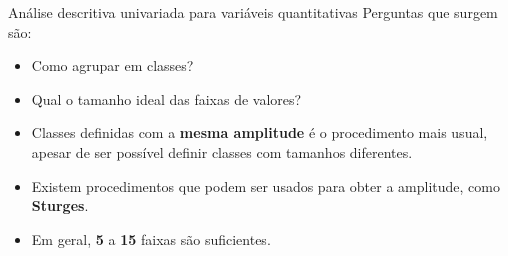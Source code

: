 \documentclass[
  ignorenonframetext,
  serif,
  professionalfont,
  usenames,
  dvipsnames,
  aspectratio = 169]{beamer}
\begin{document}
\begin{frame}{Análise descritiva univariada para variáveis
quantitativas}
\label{anuxe1lise-descritiva-univariada-para-variuxe1veis-quantitativas-4}
Perguntas que surgem são:

\begin{itemize}
\item
  Como agrupar em classes?
\item
  Qual o tamanho ideal das faixas de valores?
\end{itemize}

\vspace{0.5cm}

\begin{itemize}
\item
  Classes definidas com a \textbf{mesma amplitude} é o procedimento mais
  usual, apesar de ser possível definir classes com tamanhos diferentes.
\item
  Existem procedimentos que podem ser usados para obter a amplitude,
  como \textbf{Sturges}.
\item
  Em geral, \textbf{5} a \textbf{15} faixas são suficientes.
\end{itemize}
\end{frame}
\end{document}
